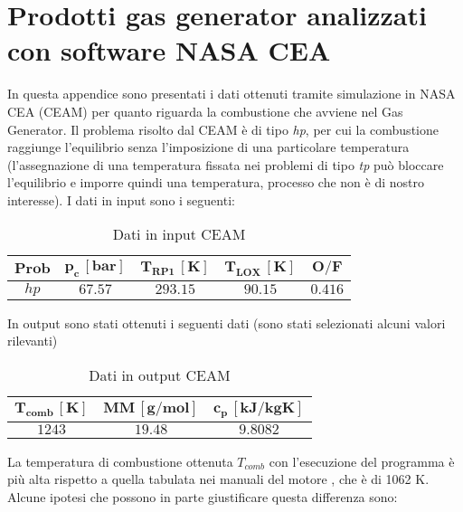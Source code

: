 \section{Prodotti gas generator analizzati con software NASA CEA}
\label{appendix:prodotti_gas_generator}

In questa appendice sono presentati i dati ottenuti tramite simulazione in NASA CEA (CEAM) per quanto riguarda la combustione che avviene nel Gas Generator. Il problema risolto dal CEAM è di tipo \textit{hp}, per cui la combustione raggiunge l'equilibrio senza l'imposizione di una particolare temperatura (l'assegnazione di una temperatura fissata nei problemi di tipo \textit{tp} può bloccare l'equilibrio e imporre quindi una temperatura, processo che non è di nostro interesse). I dati in input sono i seguenti:
\\
\begin{table}[H]

\centering
\begin{tabular}{|c|c|c|c|c|}
\hline
$\bm{Prob}$ & $\bm{p_c \, [bar]}$ & $\bm{T_{RP1} \, [K]}$ & $\bm{T_{LOX} \, [K]}$ & $\bm{O/F}$ \\
\hline
$hp$ & $67.57$ & $293.15$ & $90.15$ & $0.416$ \\
\hline
\end{tabular}
\caption{Dati in input CEAM}
\label{table:input_CEAM}
\end{table}
In output sono stati ottenuti i seguenti dati (sono stati selezionati alcuni valori rilevanti)
\begin{table}[H]

\centering
\begin{tabular}{|c|c|c|}
\hline
$\bm{T_{comb} \, [K]}$ & $\bm{MM \, [g/mol]}$ & $\bm{c_p \, [kJ/kgK]}$ \\
\hline
$1243$ & $19.48$ & $9.8082$\\
\hline
\end{tabular}

\caption{Dati in output CEAM}
\label{table:output_CEAM}

\end{table}
La temperatura di combustione ottenuta $T_{comb}$ con l'esecuzione del programma è più alta rispetto a quella tabulata nei manuali del motore \cite{f-1_manual}, che è di 1062 K. Alcune ipotesi che possono in parte giustificare questa differenza sono:
